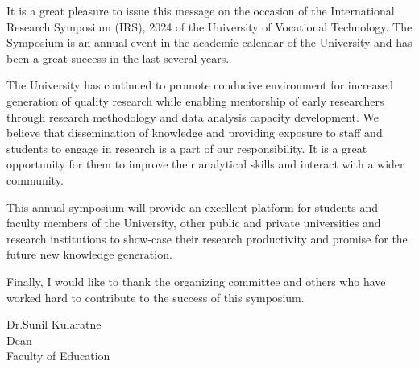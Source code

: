 \thispagestyle{fancy}
	
	\vspace{-2em} %




   
    



	
	
	
	
	It is a great pleasure to issue this message on the occasion of the International Research Symposium (IRS), 2024 of the University of Vocational Technology. The Symposium is an annual event in the academic calendar of the University and has been a great success in the last several years.
    
The University has continued to promote conducive environment for increased generation of quality research while enabling mentorship of early researchers through research methodology and data analysis capacity development. We believe that dissemination of knowledge and providing    exposure to staff and students to engage in research is a part of our responsibility. It is a great opportunity for them to improve their analytical skills and interact with a wider community.

This annual symposium will provide an excellent platform for students and faculty members of the University, other public and private universities and research institutions to show-case their research productivity and promise for the future new knowledge generation.

Finally, I would like to thank the organizing committee and others who have worked hard to contribute to the success of this symposium.
 


	\vspace{1cm}
	\noindent
	Dr.Sunil Kularatne\\
Dean\\
Faculty of Education
	\newpage
	